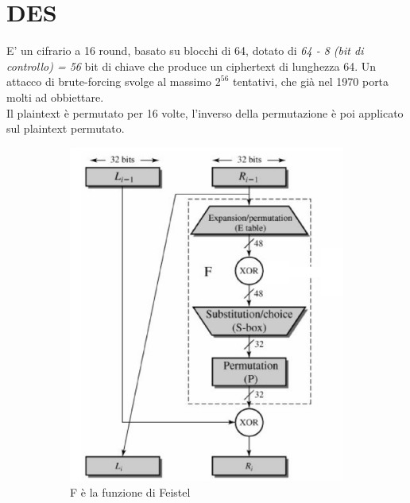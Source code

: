 \documentclass[11pt, oneside]{article}   	%
\begin{document}
\section*{DES}
E' un cifrario a 16 round, basato su blocchi di 64, dotato di \emph{64 - 8 (bit di controllo) = 56} bit di chiave che produce un ciphertext di lunghezza 64. Un attacco di brute-forcing svolge al massimo $2^{56}$ tentativi, che già nel 1970 porta molti ad obbiettare.\\
Il plaintext è permutato per 16 volte, l'inverso della permutazione è poi applicato sul plaintext permutato.
\begin{figure}[H]
\begin{subfigure}[h]{0.4\linewidth}
\includegraphics[width=\linewidth]{DES}
\caption*{F è la funzione di Feistel}
\end{subfigure}
\hfill
\begin{subfigure}[h]{0.4\linewidth}

\end{subfigure}
\end{figure}
\end{document}
